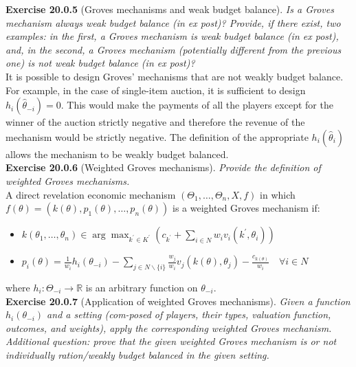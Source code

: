\textbf{Exercise 20.0.5} (Groves mechanisms and weak budget balance). \textit{Is a Groves mechanism always weak budget balance (in ex post)? Provide, if there exist, two examples: in the first, a Groves mechanism is weak budget balance (in ex post), and, in the second, a Groves mechanism (potentially different from the previous one) is not weak budget balance (in ex post)?}\\

It is possible to design Groves' mechanisms that are not weakly budget balance. For example, in the case of single-item auction, it is sufficient to design $h_i (\hat{\theta}_{-i})=0$. This would make the payments of all the players except for the winner of the auction strictly negative and therefore the revenue of the mechanism would be strictly negative. The definition of the appropriate $h_i (\hat{\theta}_{i})$ allows the mechanism to be weakly budget balanced.\\

\textbf{Exercise 20.0.6} (Weighted Groves mechanisms). \textit{Provide the definition of weighted Groves mechanisms.}\\

A direct revelation economic mechanism $\left(\Theta_{1}, \ldots, \Theta_{n}, X, f\right)$ in which $f(\theta)=\left(k(\theta), p_{1}(\theta), \ldots, p_{n}(\theta)\right)$ is a weighted Groves mechanism if:
\begin{itemize}
\item $k\left(\theta_{1}, \ldots, \theta_{n}\right) \in \arg \max _{k^{\prime} \in K^{\prime}}\left(c_{k^{\prime}}+\sum_{i \in N} w_{i} v_{i}\left(k^{\prime}, \theta_{i}\right)\right)$
\item $p_{i}(\theta)=\frac{1}{w_{i}} h_{i}\left(\theta_{-i}\right)-\sum_{j \in N \backslash\{i\}} \frac{w_{j}}{w_{i}} v_{j}\left(k(\theta), \theta_{j}\right)-\frac{c_{k(\theta)}}{w_{i}} \quad \forall i \in N$
\end{itemize}
where $h_{i}: \Theta_{-i} \rightarrow \mathbb{R}$ is an arbitrary function on $\theta_{-i}$.\\

\textbf{Exercise 20.0.7} (Application of weighted Groves mechanisms). \textit{Given a function $h_i (\theta_{-i})$ and a setting (com-posed of players, their types, valuation function, outcomes, and weights), apply the corresponding weighted Groves mechanism. Additional question: prove that the given weighted Groves mechanism is or not individually ration/weakly budget balanced in the given setting.}\\


